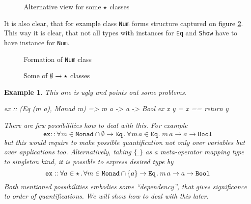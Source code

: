 \documentclass[11pt,oneside,draft]{fithesis2}
\newtheorem{example}{Example}
\begin{document}

\noindent
\begin{figure}
	\centering
	\scalebox{1.0}{}
	\caption[Alternative view for some ``star'' classes]{Alternative view for some \(\star\) classes}
	\label{diagram:kinds_star2}
\end{figure}

It is also clear, that for example class \texttt{Num} forms structure captured
on figure \ref{diagram:num_intersection}. This way it is clear, that not
all types with instances for \texttt{Eq} and \texttt{Show} have to have
instance for \texttt{Num}.

\noindent
\begin{figure}
	\centering
	\scalebox{1.0}{}
	\caption[Formation of Num class]{Formation of \texttt{Num} class}
	\label{diagram:num_intersection}
\end{figure}

\noindent
\begin{figure}
	\centering
	\scalebox{1.0}{}
	\caption[Some ``emptyset to star'' classes]{Some of \(\emptyset \to \star\) classes}
	\label{diagram:kinds_star_star}
\end{figure}

\begin{example}
This one is ugly and points out some problems.
\begin{code}
ex :: (Eq (m a), Monad m) => m a -> a -> Bool
ex x y = x == return y
\end{code}
There are few possibilities how to deal with this. For example
\[ \texttt{ex} :: \forall m \in \texttt{Monad} \cap \emptyset \to \texttt{Eq} \, . \, \forall m \, a \in \texttt{Eq} \, . \, m \, a \to a \to \texttt{Bool} \]
but this would require to make possible quantification not only over variables but over applications too.
Alternatively, taking \(\{\_\}\) as a meta-operator mapping type to singleton kind,
it is possible to express desired type by
\[ \texttt{ex} :: \forall a \in \star \, . \, \forall m \in \texttt{Monad} \cap \{ a \} \to \texttt{Eq} \, . \, m \, a \to a \to \texttt{Bool} \]
Both mentioned possibilities embodies some ``dependency'', that gives significance to order of quantifications.
We will show how to deal with this later. %
\end{example}
\end{document}
